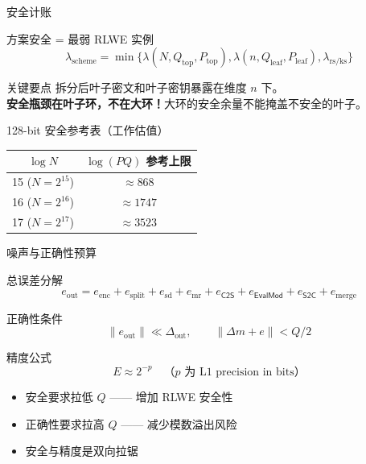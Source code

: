 \documentclass[aspectratio=169, 10pt, xcolor=svgnames, table, UTF8]{ctexbeamer}
\newcommand{\cots}{\mathsf{C2S}}
\newcommand{\stoc}{\mathsf{S2C}}
\newcommand{\evalmod}{\mathsf{EvalMod}}
\begin{document}
\begin{frame}{安全计账}
  \begin{block}{方案安全 = 最弱 RLWE 实例}
    \[
    \lambda_{\mathrm{scheme}} = \min\{
    \lambda(N, Q_{\mathrm{top}}, P_{\mathrm{top}}),
    \lambda(n, Q_{\mathrm{leaf}}, P_{\mathrm{leaf}}),
    \lambda_{\mathrm{rs/ks}}
    \}
    \]
  \end{block}
  
  \pause
  
  \begin{alertblock}{关键要点}
    拆分后叶子密文和叶子密钥暴露在维度 \(n\) 下。\\
    \textbf{安全瓶颈在叶子环，不在大环！}大环的安全余量不能掩盖不安全的叶子。
  \end{alertblock}
  
  \pause
  
  \begin{block}{128-bit 安全参考表（工作估值）}
    \begin{center}
    \begin{tabular}{@{}cc@{}}
      \toprule
      \(\log N\) & \(\log(PQ)\) 参考上限 \\
      \midrule
      15 (\(N=2^{15}\)) & \(\approx 868\) \\
      16 (\(N=2^{16}\)) & \(\approx 1747\) \\
      17 (\(N=2^{17}\)) & \(\approx 3523\) \\
      \bottomrule
    \end{tabular}
    \end{center}
  \end{block}
\end{frame}

\begin{frame}{噪声与正确性预算}
  \begin{block}{总误差分解}
    \[
    \boxed{e_{\mathrm{out}} = e_{\mathrm{enc}} + e_{\mathrm{split}} + e_{\mathrm{sd}} + e_{\mathrm{mr}} + e_{\mathrm{\cots}} + e_{\mathrm{\evalmod}} + e_{\mathrm{\stoc}} + e_{\mathrm{merge}}}
    \]
  \end{block}
  
  \pause
  
  \begin{block}{正确性条件}
    \[
    \|e_{\mathrm{out}}\| \ll \Delta_{\mathrm{out}}, \qquad \|\Delta m + e\| < Q/2
    \]
  \end{block}
  
  \pause
  
  \begin{block}{精度公式}
    \[
    E \approx 2^{-p} \quad\text{（\(p\) 为 L1 precision in bits）}
    \]
  \end{block}
  
  \begin{itemize}
    \item 安全要求拉低 \(Q\) —— 增加 RLWE 安全性
    \item 正确性要求拉高 \(Q\) —— 减少模数溢出风险
    \item \alert{安全与精度是双向拉锯}
  \end{itemize}
\end{frame}
\end{document}
